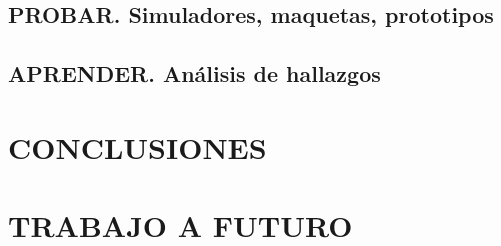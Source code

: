 \documentclass[12pt,letterpaper]{book}
\begin{document}
\section{PROBAR. Simuladores, maquetas, prototipos}

\section{APRENDER. Análisis de hallazgos}

\newpage

\chapter{CONCLUSIONES}

\chapter{TRABAJO A FUTURO}
\end{document}
